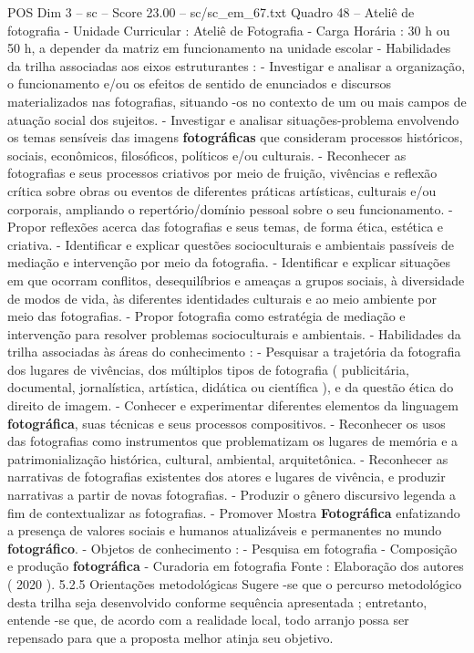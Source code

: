 \begin{textsample}{POS Dim 3 – sc – Score 23.00 – sc/sc\_em\_67.txt}
Quadro 48 – Ateliê de fotografia - Unidade Curricular : Ateliê de Fotografia - Carga Horária : 30 h ou 50 h, a depender da matriz em funcionamento na unidade escolar - Habilidades da trilha associadas aos eixos estruturantes : - Investigar e analisar a organização, o funcionamento e/ou os efeitos de sentido de enunciados e discursos materializados nas fotografias, situando -os no contexto de um ou mais campos de atuação social dos sujeitos. - Investigar e analisar situações-problema envolvendo os temas sensíveis das imagens \textbf{fotográficas} que consideram processos históricos, sociais, econômicos, filosóficos, políticos e/ou culturais. - Reconhecer as fotografias e seus processos criativos por meio de fruição, vivências e reflexão crítica sobre obras ou eventos de diferentes práticas artísticas, culturais e/ou corporais, ampliando o repertório/domínio pessoal sobre o seu funcionamento. - Propor reflexões acerca das fotografias e seus temas, de forma ética, estética e criativa. - Identificar e explicar questões socioculturais e ambientais passíveis de mediação e intervenção por meio da fotografia. - Identificar e explicar situações em que ocorram conflitos, desequilíbrios e ameaças a grupos sociais, à diversidade de modos de vida, às diferentes identidades culturais e ao meio ambiente por meio das fotografias. - Propor fotografia como estratégia de mediação e intervenção para resolver problemas socioculturais e ambientais. - Habilidades da trilha associadas às áreas do conhecimento : - Pesquisar a trajetória da fotografia dos lugares de vivências, dos múltiplos tipos de fotografia ( publicitária, documental, jornalística, artística, didática ou científica ), e da questão ética do direito de imagem. - Conhecer e experimentar diferentes elementos da linguagem \textbf{fotográfica}, suas técnicas e seus processos compositivos. - Reconhecer os usos das fotografias como instrumentos que problematizam os lugares de memória e a patrimonialização histórica, cultural, ambiental, arquitetônica. - Reconhecer as narrativas de fotografias existentes dos atores e lugares de vivência, e produzir narrativas a partir de novas fotografias. - Produzir o gênero discursivo legenda a fim de contextualizar as fotografias. - Promover Mostra \textbf{Fotográfica} enfatizando a presença de valores sociais e humanos atualizáveis e permanentes no mundo \textbf{fotográfico}. - Objetos de conhecimento : - Pesquisa em fotografia - Composição e produção \textbf{fotográfica} - Curadoria em fotografia Fonte : Elaboração dos autores ( 2020 ). 5.2.5 Orientações metodológicas Sugere -se que o percurso metodológico desta trilha seja desenvolvido conforme sequência apresentada ; entretanto, entende -se que, de acordo com a realidade local, todo arranjo possa ser repensado para que a proposta melhor atinja seu objetivo.

\end{textsample}
